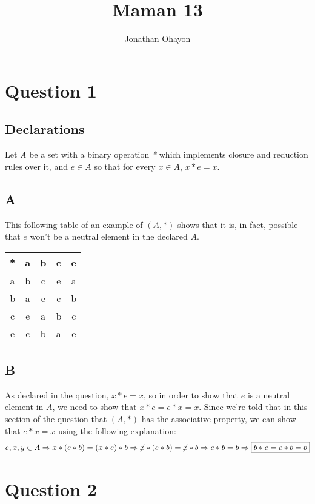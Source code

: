 \documentclass[12pt, oneside]{article}
\title{Maman 13}
\author{Jonathan Ohayon}
\begin{document}
\maketitle

\section{Question 1}
\setcounter{subsection}{-1}
\subsection{Declarations}
Let \emph{A} be a set with a binary operation \emph{*} which implements closure and reduction rules over it, and $e \in A$ so that for every $x \in A$, $x * e = x$.

\subsection{A}
This following table of an example of $(A, *)$ shows that it is, in fact, possible that $e$ won't be a neutral element in the declared $A$.
\begin{center}
\begin{tabular}{c | c | c | c | c}
* & a & b & c & e\\
\hline
a & b & c & e & a \\
\hline
b & a & e & c & b \\
\hline
c & e & a & b & c \\
\hline
e & c & b & a & e \\
\end{tabular}
\end{center}

\subsection{B}
As declared in the question, $x * e = x$, so in order to show that $e$ is a neutral element in $A$, we need to show that $x * e = e * x = x$. Since we're told that in this section of the question that $(A, *)$ has the associative property, we can show that $e * x = x$ using the following explanation:
\begin{equation*}
e, x, y \in A \Rightarrow
x * (e * b) = (x * e) * b \Rightarrow
\cancel{x} * (e * b) = \cancel{x} * b \Rightarrow
e * b = b \Rightarrow
\framebox{$b * e = e * b = b$}
\end{equation*}

\clearpage

\section{Question 2}
\setcounter{subsection}{-1}
\end{document}

